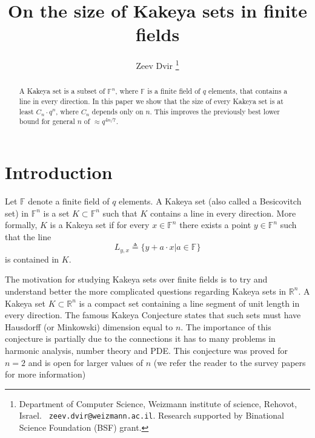 \documentclass[12pt]{article}
\def\F{{\mathbb{F}}}
\def\R{{\mathbb{R}}}
\begin{document}
\title{On the size of Kakeya sets in finite fields}
\author{Zeev Dvir \thanks{Department of Computer Science, Weizmann
institute of science, Rehovot, Israel.  {\tt
zeev.dvir@weizmann.ac.il}. Research supported by Binational
Science Foundation (BSF) grant.}}
\date{}
\maketitle


\begin{abstract}
A Kakeya set is a subset of $\F^n$, where $\F$ is a finite field
of $q$ elements, that contains a line in every direction. In this
paper we show that the size of every Kakeya set is at least $C_{n}
\cdot q^{n}$, where $C_{n}$ depends only on $n$. This improves the
previously best lower bound for general $n$ of $\approx q^{4n/7}$.
\end{abstract}
{}




\section{Introduction}

Let $\F$ denote a finite field of $q$ elements. A {\sf Kakeya} set
(also called a {\sf Besicovitch} set) in $\F^n$ is a set $K
\subset \F^n$ such that $K$ contains a line in every direction.
More formally, $K$ is a Kakeya set if for every $x \in \F^n$ there
exists a point $y \in \F^n$ such that the line
\[ L_{y, x} \triangleq \{ y + a\cdot x | a \in \F \} \]
is contained in $K$.

The motivation for studying Kakeya sets over finite fields is to
try and understand better the more complicated questions regarding
Kakeya sets in $\R^n$. A Kakeya set $K \subset \R^n$ is a compact
set containing a line segment of unit length in every direction.
The famous Kakeya Conjecture states that such sets must have
Hausdorff (or Minkowski) dimension equal to $n$. The importance of
this conjecture is partially due to the connections it has to many
problems in harmonic analysis, number theory and PDE. This
conjecture was proved for $n=2$ \cite{Davies71} and is open for
larger values of $n$ (we refer the reader to the survey papers
\cite{Wolff99,Bou00,Tao01} for more information)
\end{document}
